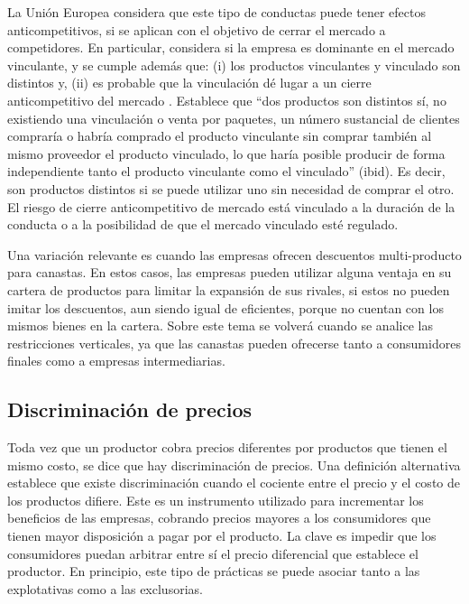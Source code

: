 \documentclass[
  12pt,
  spanish,
]{book}
\begin{document}
La Unión Europea considera que este tipo de conductas puede tener
efectos anticompetitivos, si se aplican con el objetivo de cerrar el
mercado a competidores. En particular, considera si la empresa es
dominante en el mercado vinculante, y se cumple además que: (i) los
productos vinculantes y vinculado son distintos y, (ii) es probable que
la vinculación dé lugar a un cierre anticompetitivo del mercado
\citep[p.~C 45/15]{UE2009}. Establece que ``dos productos son distintos
sí, no existiendo una vinculación o venta por paquetes, un número
sustancial de clientes compraría o habría comprado el producto
vinculante sin comprar también al mismo proveedor el producto vinculado,
lo que haría posible producir de forma independiente tanto el producto
vinculante como el vinculado'' (ibid). Es decir, son productos distintos
si se puede utilizar uno sin necesidad de comprar el otro. El riesgo de
cierre anticompetitivo de mercado está vinculado a la duración de la
conducta o a la posibilidad de que el mercado vinculado esté regulado.

Una variación relevante es cuando las empresas ofrecen descuentos
multi-producto para canastas. En estos casos, las empresas pueden
utilizar alguna ventaja en su cartera de productos para limitar la
expansión de sus rivales, si estos no pueden imitar los descuentos, aun
siendo igual de eficientes, porque no cuentan con los mismos bienes en
la cartera. Sobre este tema se volverá cuando se analice las
restricciones verticales, ya que las canastas pueden ofrecerse tanto a
consumidores finales como a empresas intermediarias.

\hypertarget{discriminaciuxf3n-de-precios}{%
\subsection{Discriminación de
precios}\label{discriminaciuxf3n-de-precios}}

Toda vez que un productor cobra precios diferentes por productos que
tienen el mismo costo, se dice que hay discriminación de precios. Una
definición alternativa establece que existe discriminación cuando el
cociente entre el precio y el costo de los productos difiere. Este es un
instrumento utilizado para incrementar los beneficios de las empresas,
cobrando precios mayores a los consumidores que tienen mayor disposición
a pagar por el producto. La clave es impedir que los consumidores puedan
arbitrar entre sí el precio diferencial que establece el productor. En
principio, este tipo de prácticas se puede asociar tanto a las
explotativas como a las exclusorias.
\end{document}
